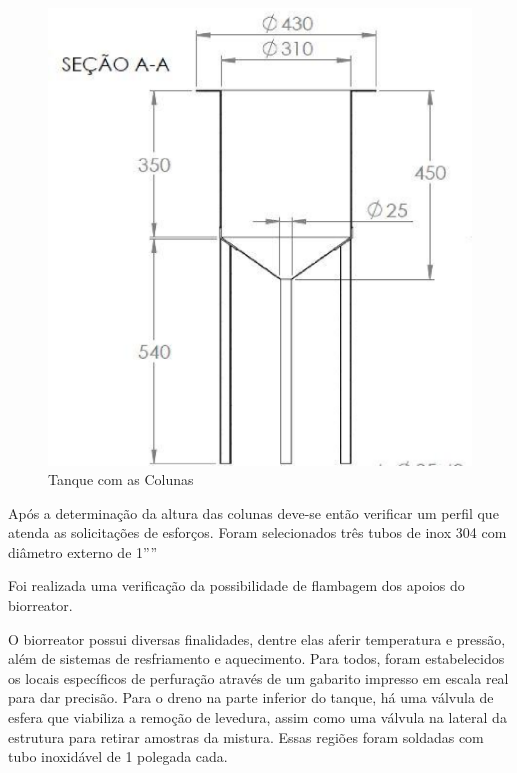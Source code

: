 \begin{figure}[h]
 \centering
 \includegraphics[keepaspectratio=true,scale=0.5]{figuras/tanque.eps}
 \caption{Tanque com as Colunas}
 \label{tanque}
\end{figure}


Após a determinação da altura das colunas deve-se então verificar um perfil que atenda as solicitações de esforços. Foram selecionados três tubos de inox 304 com diâmetro externo de 1””

Foi realizada uma verificação da possibilidade de flambagem dos apoios do biorreator.

O biorreator possui diversas finalidades, dentre elas aferir temperatura e pressão, além de sistemas de resfriamento e aquecimento. Para todos, foram estabelecidos os locais específicos de perfuração através de um gabarito impresso em escala real para dar precisão. Para o dreno na parte inferior do tanque, há uma válvula de esfera que viabiliza a remoção de levedura, assim como uma válvula na lateral da estrutura para retirar amostras da mistura. Essas regiões foram soldadas com tubo inoxidável de 1 polegada cada.

